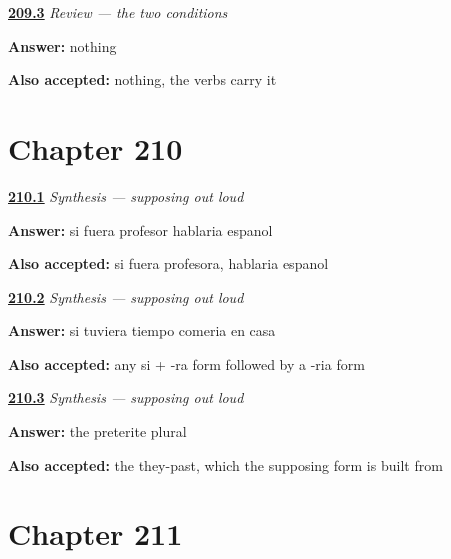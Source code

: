 \noindent\begin{minipage}[t]{\linewidth}
\raggedright
\hyperlink{review-ES-C56-repaso-condiciones-si}{\textbf{209.3}} \emph{Review — the two conditions}\par
\small \textbf{Answer:} nothing\par
\footnotesize \textbf{Also accepted:} nothing, the verbs carry it
\end{minipage}\par\medskip

\section*{Chapter 210}

\noindent\begin{minipage}[t]{\linewidth}
\raggedright
\hyperlink{review-ES-C56-sintesis-condiciones-ser}{\textbf{210.1}} \emph{Synthesis — supposing out loud}\par
\small \textbf{Answer:} si fuera profesor hablaria espanol\par
\footnotesize \textbf{Also accepted:} si fuera profesora, hablaria espanol
\end{minipage}\par\medskip

\noindent\begin{minipage}[t]{\linewidth}
\raggedright
\hyperlink{review-ES-C56-sintesis-condiciones-own}{\textbf{210.2}} \emph{Synthesis — supposing out loud}\par
\small \textbf{Answer:} si tuviera tiempo comeria en casa\par
\footnotesize \textbf{Also accepted:} any si + -ra form followed by a -ria form
\end{minipage}\par\medskip

\noindent\begin{minipage}[t]{\linewidth}
\raggedright
\hyperlink{review-ES-C56-sintesis-condiciones-cost}{\textbf{210.3}} \emph{Synthesis — supposing out loud}\par
\small \textbf{Answer:} the preterite plural\par
\footnotesize \textbf{Also accepted:} the they-past, which the supposing form is built from
\end{minipage}\par\medskip

\section*{Chapter 211}

